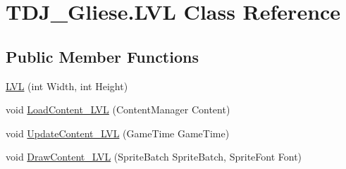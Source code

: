 \hypertarget{class_t_d_j___gliese_1_1_l_v_l}{}\section{T\+D\+J\+\_\+\+Gliese.\+L\+VL Class Reference}
\label{class_t_d_j___gliese_1_1_l_v_l}
\subsection*{Public Member Functions}
\begin{DoxyCompactItemize}
\item 
\hyperlink{class_t_d_j___gliese_1_1_l_v_l_a76589d67b7a7d414ddb3b02fa70f8df7}{L\+VL} (int Width, int Height)
\item 
void \hyperlink{class_t_d_j___gliese_1_1_l_v_l_a05f0bd493f8b55c2cf62ca24bf9ec93e}{Load\+Content\+\_\+\+L\+VL} (Content\+Manager Content)
\item 
void \hyperlink{class_t_d_j___gliese_1_1_l_v_l_aaaea696f38f78962ea2abddcd0ed1f94}{Update\+Content\+\_\+\+L\+VL} (Game\+Time Game\+Time)
\item 
void \hyperlink{class_t_d_j___gliese_1_1_l_v_l_a138ed1b814d02ef00467e81c1abef032}{Draw\+Content\+\_\+\+L\+VL} (Sprite\+Batch Sprite\+Batch, Sprite\+Font Font)
\end{DoxyCompactItemize}
